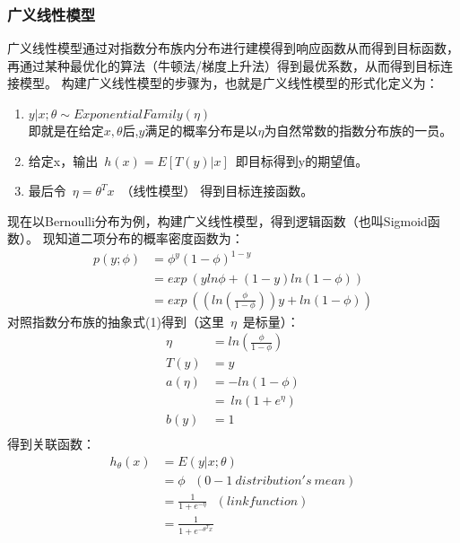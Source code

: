 \subsubsection{广义线性模型}
广义线性模型通过对指数分布族内分布进行建模得到响应函数从而得到目标函数，再通过某种最优化的算法（牛顿法/梯度上升法）得到最优系数，从而得到目标连接模型。
构建广义线性模型的步骤为，也就是广义线性模型的形式化定义为：
\begin{enumerate}
  \item $y|x;\theta \sim ExponentialFamily(\eta)$ \\即就是在给定$x,\theta$后,$y$满足的概率分布是以$\eta$为自然常数的指数分布族的一员。
  \item 给定x，输出~$h(x)=E[T(y)|x]$~即目标得到y的期望值。
  \item 最后令~$\eta=\theta^Tx$~（线性模型） 得到目标连接函数。
\end{enumerate}

现在以Bernoulli分布为例，构建广义线性模型，得到逻辑函数（也叫Sigmoid函数）。
现知道二项分布的概率密度函数为：
\begin{equation}\nonumber
\begin{split}
  p(y;\phi)&= \phi^y(1-\phi)^{1-y}\\
           &= exp~(yln\phi+(1-y)ln(1-\phi))\\
           &= exp~((ln(\frac{\phi}{1-\phi}))y+ln(1-\phi))
\end{split}
\end{equation}
对照指数分布族的抽象式(1)得到（这里~$\eta$~是标量）：
\begin{equation}\nonumber
\begin{split}
  \eta   &=ln(\frac{\phi}{1-\phi}) \\
  T(y)   &= y\\
  a(\eta)&= -ln(1-\phi)\\
         &= ~ln(1+e^\eta)\\
  b(y)   &= 1\\
\end{split}
\end{equation}
得到关联函数：
\begin{equation}\nonumber
\begin{split}
  h_\theta(x) &= E(y|x;\theta)\\
              &= \phi~~~ (0-1~distribution's~mean)\\
              &= \frac{1}{1+e^{-\eta}}~~~(link function)\\
              &= \frac{1}{1+e^{-\theta^T x}}
\end{split}
\end{equation}

